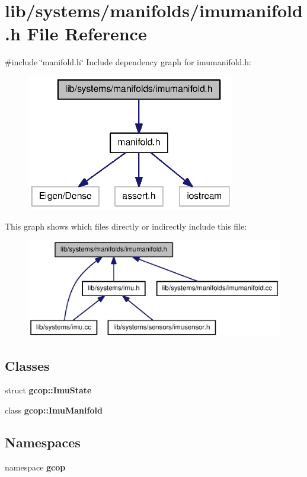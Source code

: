 \section{lib/systems/manifolds/imumanifold.h \-File \-Reference}
\label{imumanifold_8h}
{\ttfamily \#include \char`\"{}manifold.\-h\char`\"{}}\*
\-Include dependency graph for imumanifold.\-h\-:
\nopagebreak
\begin{figure}[H]
\begin{center}
\leavevmode
\includegraphics[width=258pt]{imumanifold_8h__incl}
\end{center}
\end{figure}
\-This graph shows which files directly or indirectly include this file\-:
\nopagebreak
\begin{figure}[H]
\begin{center}
\leavevmode
\includegraphics[width=350pt]{imumanifold_8h__dep__incl}
\end{center}
\end{figure}
\subsection*{\-Classes}
\begin{DoxyCompactItemize}
\item 
struct {\bf gcop\-::\-Imu\-State}
\item 
class {\bf gcop\-::\-Imu\-Manifold}
\end{DoxyCompactItemize}
\subsection*{\-Namespaces}
\begin{DoxyCompactItemize}
\item 
namespace {\bf gcop}
\end{DoxyCompactItemize}
